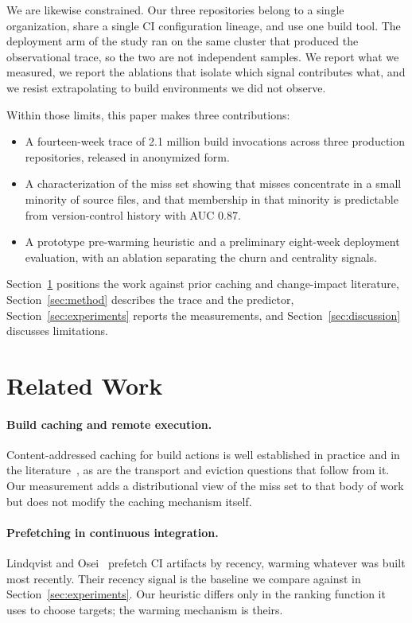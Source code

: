 \documentclass{anvil-paper}
\begin{document}
We are likewise constrained. Our three repositories belong to a single
organization, share a single CI configuration lineage, and use one build tool.
The deployment arm of the study ran on the same cluster that produced the
observational trace, so the two are not independent samples. We report what we
measured, we report the ablations that isolate which signal contributes what,
and we resist extrapolating to build environments we did not observe.

Within those limits, this paper makes three contributions:

\begin{itemize}
  \item A fourteen-week trace of 2.1 million build invocations across three
        production repositories, released in anonymized form.
  \item A characterization of the miss set showing that misses concentrate in
        a small minority of source files, and that membership in that minority
        is predictable from version-control history with AUC 0.87.
  \item A prototype pre-warming heuristic and a preliminary eight-week
        deployment evaluation, with an ablation separating the churn and
        centrality signals.
\end{itemize}

Section~\ref{sec:related} positions the work against prior caching and
change-impact literature, Section~\ref{sec:method} describes the trace and the
predictor, Section~\ref{sec:experiments} reports the measurements, and
Section~\ref{sec:discussion} discusses limitations.

\section{Related Work}
\label{sec:related}

\paragraph{Build caching and remote execution.}
Content-addressed caching for build actions is well established in practice
and in the literature~\cite{okonkwo2019remote}, as are the transport and
eviction questions that follow from it. Our measurement adds a distributional
view of the miss set to that body of work but does not modify the caching
mechanism itself.

\paragraph{Prefetching in continuous integration.}
Lindqvist and Osei~\cite{lindqvist2021prefetch} prefetch CI artifacts by
recency, warming whatever was built most recently. Their recency signal is the
baseline we compare against in Section~\ref{sec:experiments}. Our heuristic
differs only in the ranking function it uses to choose targets; the warming
mechanism is theirs.
\end{document}
